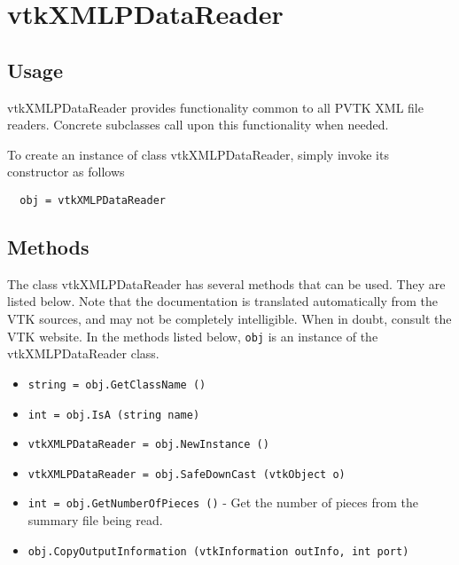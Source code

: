 \section{vtkXMLPDataReader}

\subsection{Usage}

 vtkXMLPDataReader provides functionality common to all PVTK XML
 file readers.  Concrete subclasses call upon this functionality
 when needed.

To create an instance of class vtkXMLPDataReader, simply
invoke its constructor as follows
\begin{verbatim}
  obj = vtkXMLPDataReader
\end{verbatim}
\subsection{Methods}

The class vtkXMLPDataReader has several methods that can be used.
  They are listed below.
Note that the documentation is translated automatically from the VTK sources,
and may not be completely intelligible.  When in doubt, consult the VTK website.
In the methods listed below, \verb|obj| is an instance of the vtkXMLPDataReader class.
\begin{itemize}
\item  \verb|string = obj.GetClassName ()|

\item  \verb|int = obj.IsA (string name)|

\item  \verb|vtkXMLPDataReader = obj.NewInstance ()|

\item  \verb|vtkXMLPDataReader = obj.SafeDownCast (vtkObject o)|

\item  \verb|int = obj.GetNumberOfPieces ()| -  Get the number of pieces from the summary file being read.

\item  \verb|obj.CopyOutputInformation (vtkInformation outInfo, int port)|

\end{itemize}
